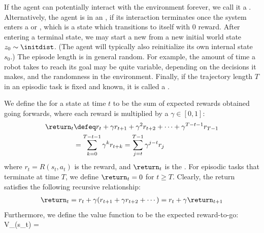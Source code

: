 If the agent can potentially interact with the environment forever,
we call it a .
Alternatively, the agent is in an
,
if its interaction terminates once the system enters a
 or ,
which is a state which transitions to itself with 0 reward.
After entering a terminal state,
we may start a new 
from a new initial world state $z_0 \sim \initdist$.
(The agent will typically also reinitialize its own internal state $s_0$.)
The episode length is in general random.
For example, the amount of time
a robot takes to reach its goal may be quite variable,
depending on the decisions it makes,
and the randomness in the environment.
Finally, if the trajectory length $T$
in an episodic task is fixed and known,
it is called a .

We define the   for a state at time $t$
to be the sum of expected rewards obtained
going forwards, where each reward is multiplied
by a  $\gamma \in [0,1]$:
\begin{align}
\return_t &\defeq r_t + \gamma r_{t+1} + \gamma^2 r_{t+2} + \cdots
+ \gamma^{T-t-1} r_{T-1}
\label{eqn:rl-return} \\
&= \sum_{k=0}^{T-t-1} \gamma^k r_{t+k}
= \sum_{j=t}^{T-1} \gamma^{j-t} r_j
\end{align}
where $r_t=R(s_t,a_t)$ is the reward,
and
$\return_t$ is  the .
For episodic tasks that terminate at time $T$,
we define $\return_t = 0$ for $t \ge T$.
Clearly, the return satisfies the following
recursive relationship:
\begin{align}
\return_t 
= r_{t} + \gamma (r_{t+1} + \gamma r_{t+2} + \cdots) = r_{t} + \gamma \return_{t+1}
\end{align}
Furthermore, we define the value function to be the expected
reward-to-go:
\be
V_{\pi}(s_t) = 
\ee

